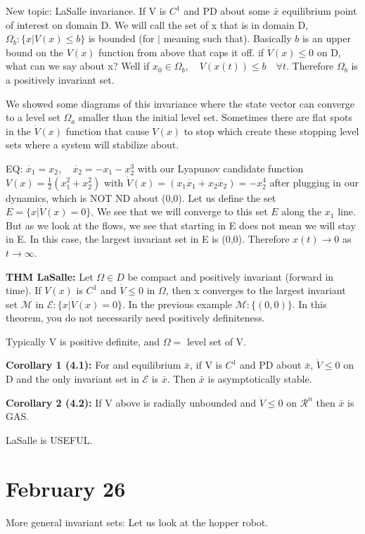 \documentclass[11pt]{article}
\begin{document}
New topic: LaSalle invariance. If V is $C^1$ and PD about some $\bar{x}$ equilibrium point of interest on domain D. We will call the set of x that is in domain D,  $\Omega_b : \{x \rvert V(x) \leq b \}$ is bounded (for $\rvert$ meaning such that). Basically $b$ is an upper bound on the $V(x)$ function from above that caps it off. if $\dot{V}(x) \leq 0 $ on D, what can we say about x? Well if $x_0 \in \Omega_b, \quad V(x(t)) \leq b \quad \forall t$. Therefore $\Omega_b$ is a positively invariant set.

We showed some diagrams of this invariance where the state vector can converge to a level set $\Omega_a$ smaller than the initial level set. Sometimes there are flat spots in the $\dot{V}(x)$ function that cause $V(x)$ to stop which create these stopping level sets where a system will stabilize about. 

EQ: $\dot{x_1} = x_2, \quad \dot{x_2} = -x_1 - x_2^3$ with our Lyapunov candidate function $V(x)= \frac{1}{2}(x_1^2 +x_2^2)$ with $\dot{V}(x) = (x_1 \dot{x_1} + x_2 \dot{x_2}) = -x_2^4$ after plugging in our dynamics, which is NOT ND about (0,0). Let us define the set $E=\{ x \rvert \dot{V}(x) = 0 \}$. We see that we will converge to this set $E$ along the $x_1$ line. But as we look at the flows, we see that starting in E does not mean we will stay in E. In this case, the largest invariant set in E is (0,0). Therefore $x(t) \rightarrow 0 $ as $t \rightarrow \infty$.

\textbf{THM LaSalle:} Let $\Omega \in D$ be compact and positively invariant (forward in time). If $V(x)$ is $C^1$ and $\dot{V} \leq 0$ in $\Omega$, then x converges to the largest invariant set $\mathcal{M}$ in $\mathcal{E}:\{ x \rvert \dot{V}(x) =0 \}$. In the previous example $\mathcal{M} : \{ (0,0) \}$. In this theorem, you do not necessarily need positively definiteness. 

Typically V is positive definite, and $\Omega = $ level set of V.

\textbf{Corollary 1 (4.1):} For and equilibrium $\bar{x}$, if V is $C^1$ and PD about $\bar{x}$, $\dot{V}\leq 0$ on D and the only invariant set in $\mathcal{E}$ is $\bar{x}$. Then $\bar{x}$ is asymptotically stable.

\textbf{Corollary 2 (4.2):} If V above is radially unbounded and $\dot{V} \leq 0$ on $\mathcal{R}^n$ then $\bar{x}$ is GAS.

LaSalle is USEFUL.




\section{February 26}
More general invariant sets: Let us look at the hopper robot.
\end{document}
